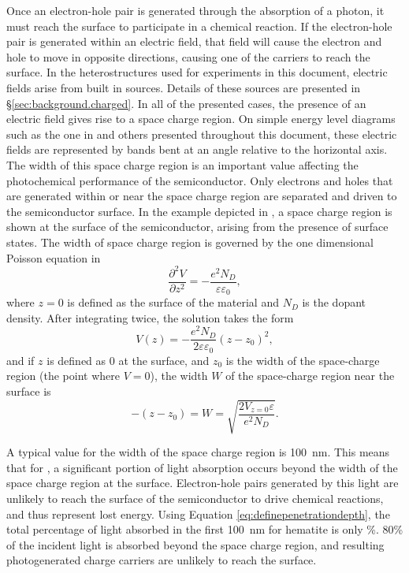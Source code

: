 Once an electron-hole pair is generated through the absorption of a photon, it must reach
the surface to participate in a chemical reaction. If the electron-hole pair is generated
within an electric field,  that field will cause the electron and hole to move in opposite
directions, causing one of the carriers to reach the surface. In the heterostructures used
for experiments in this document, electric fields arise from built in sources. Details of
these sources are presented in \S\ref{sec:background.charged}. In all of the presented
cases, the presence of an electric field gives rise to a space charge region. On simple
energy level diagrams such as the one in  and others presented
throughout this document, these electric fields are represented by bands bent at an angle
relative to the horizontal axis. The width of this space charge region is an important
value affecting the photochemical performance of the semiconductor. Only electrons and
holes that are generated within or near the space charge region are separated and driven
to the semiconductor surface. In the example depicted in , a space
charge region is shown at the surface of the semiconductor, arising from the presence of
surface states. The width of space charge region is governed by the one dimensional
Poisson equation in 
\begin{equation}
	\label{eq:poisson}
	\frac{\partial^{2}V}{{\partial}z^{2}}=-\frac{e^{2}N_{D}}{\varepsilon \varepsilon_{0}},
\end{equation}
where $z=0$ is defined as the surface of the material and $N_{D}$ is the dopant density.
After integrating twice, the solution takes the form
\begin{equation}
	\label{eq:poissonsolved}
	V(z)=-\frac{e^{2}N_{D}}{2\varepsilon \varepsilon_{0}}(z-z_{0})^{2},
\end{equation}
and if $z$ is defined as 0 at the surface, and $z_{0}$ is the width of the space-charge
region (the point where $V=0$), the width $W$ of the space-charge region near the surface
is
\begin{equation}
	\label{eq:spacechargewidth}
	-(z-z_{0})=W=\sqrt{\frac{2V_{z=0}\varepsilon}{e^{2}N_{D}}}\text{.}
\end{equation}

A typical value for the width of the space charge region is \SI{100}{\nano\meter}. This
means that for , a significant portion of light absorption occurs beyond the
width of the space charge region at the surface. Electron-hole pairs generated by this
light are unlikely to reach the surface of the semiconductor to drive chemical reactions,
and thus represent lost energy. Using Equation \ref{eq:definepenetrationdepth}, the total
percentage of light absorbed in the first \SI{100}{\nano\meter} for hematite is only
\%. 80\% of the incident light is absorbed beyond the space charge region,
and resulting photogenerated charge carriers are unlikely to reach the surface.

